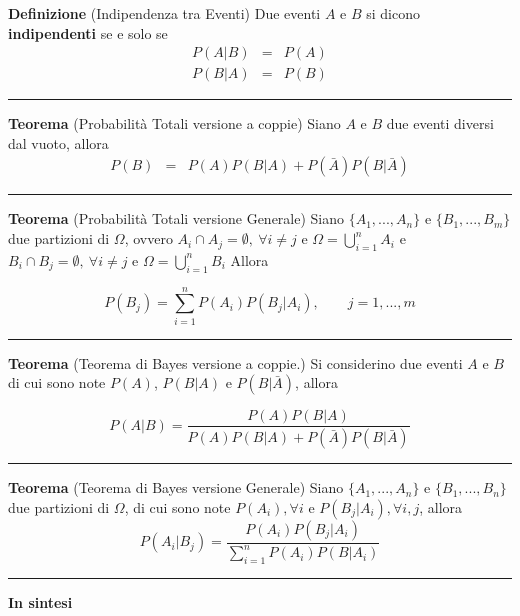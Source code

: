 \documentclass[
  11pt,
]{book}
\theoremstyle{mytheoremstyle}
\theoremstyle{mydefstyle}
\begin{document}
\textbf{Definizione} (Indipendenza tra Eventi)
Due eventi \(A\) e \(B\) si dicono \textbf{indipendenti} se e solo se
\begin{eqnarray*}
P(A|B)&=&P(A)\\
P(B|A)&=&P(B)
\end{eqnarray*}

\begin{center}\rule{0.5\linewidth}{0.5pt}\end{center}

\textbf{Teorema} (Probabilità Totali versione a coppie)
Siano \(A\) e \(B\) due eventi diversi dal vuoto, allora \begin{eqnarray*}
P(B)&=&P(A)P(B|A)+P(\bar A)P(B|\bar A)
\end{eqnarray*}

\begin{center}\rule{0.5\linewidth}{0.5pt}\end{center}

\textbf{Teorema} (Probabilità Totali versione Generale)
Siano \(\{A_1,...,A_n\}\) e \(\{B_1,...,B_m\}\) due partizioni di \(\Omega\), ovvero
\(A_i\cap A_j=\emptyset, ~\forall i\ne j\) e \(\Omega=\bigcup_{i=1}^n A_i\) e
\(B_i\cap B_j=\emptyset, ~\forall i\ne j\) e \(\Omega=\bigcup_{i=1}^n B_i\)
Allora

\[
P(B_j)=\sum_{i=1}^nP(A_i)P(B_j|A_i),\qquad j=1,...,m
\]

\begin{center}\rule{0.5\linewidth}{0.5pt}\end{center}

\textbf{Teorema} (Teorema di Bayes versione a coppie.)
Si considerino due eventi \(A\) e \(B\) di cui sono note \(P(A)\), \(P(B|A)\) e
\(P(B|\bar A)\), allora

\[
P(A|B)=\frac{P(A)P(B|A)}{P(A)P(B|A)+P(\bar A)P(B|\bar A)}
\]

\begin{center}\rule{0.5\linewidth}{0.5pt}\end{center}

\textbf{Teorema} (Teorema di Bayes versione Generale)
Siano \(\{A_1,...,A_n\}\) e \(\{B_1,...,B_n\}\) due partizioni di \(\Omega\),
di cui sono note \(P(A_i), \forall i\) e \(P(B_j|A_i), \forall i,j\), allora
\[
P(A_i|B_j)=\frac{P(A_i)P(B_j|A_i)} {\sum_{i=1}^nP(A_i)P(B|A_i)}
\]

\begin{center}\rule{0.5\linewidth}{0.5pt}\end{center}

\textbf{In sintesi}
\end{document}
